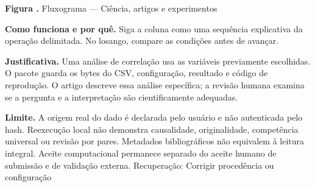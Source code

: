 {\small\textbf{Figura \thefigure.} Fluxograma --- Ciência, artigos e experimentos}\par\smallskip
\noindent\textbf{Como funciona e por quê.} Siga a coluna como uma sequência explicativa da operação delimitada. No losango, compare as condições antes de avançar.\par
\noindent\textbf{Justificativa.} Uma análise de correlação usa as variáveis previamente escolhidas. O pacote guarda os bytes do CSV, configuração, resultado e código de reprodução. O artigo descreve essa análise específica; a revisão humana examina se a pergunta e a interpretação são cientificamente adequadas.\par
\noindent\textbf{Limite.} A origem real do dado é declarada pelo usuário e não autenticada pelo hash. Reexecução local não demonstra causalidade, originalidade, competência universal ou revisão por pares. Metadados bibliográficos não equivalem à leitura integral. Aceite computacional permanece separado do aceite humano de submissão e de validação externa. Recuperação: Corrigir procedência ou configuração\par\smallskip
{}
